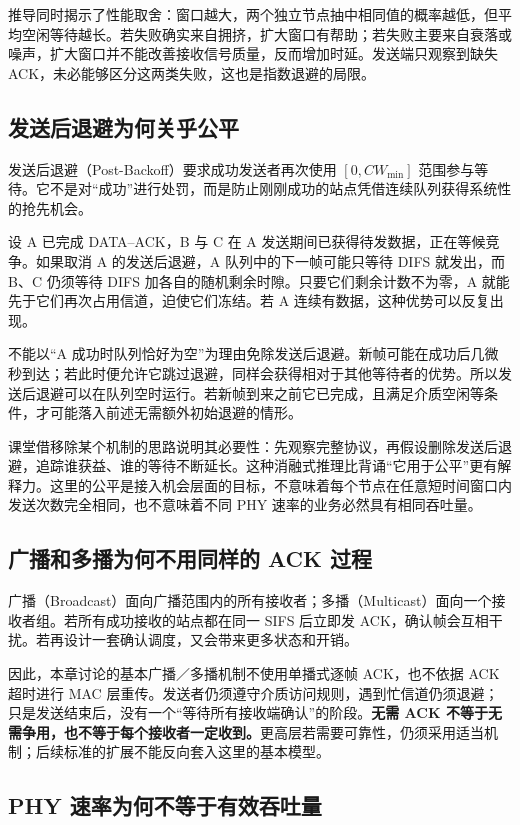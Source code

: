 推导同时揭示了性能取舍：窗口越大，两个独立节点抽中相同值的概率越低，但平均空闲等待越长。若失败确实来自拥挤，扩大窗口有帮助；若失败主要来自衰落或噪声，扩大窗口并不能改善接收信号质量，反而增加时延。发送端只观察到缺失 ACK，未必能够区分这两类失败，这也是指数退避的局限。

\subsection{发送后退避为何关乎公平}

发送后退避（Post-Backoff）要求成功发送者再次使用 $[0,CW_{\min}]$ 范围参与等待。它不是对“成功”进行处罚，而是防止刚刚成功的站点凭借连续队列获得系统性的抢先机会。

设 A 已完成 DATA--ACK，B 与 C 在 A 发送期间已获得待发数据，正在等候竞争。如果取消 A 的发送后退避，A 队列中的下一帧可能只等待 DIFS 就发出，而 B、C 仍须等待 DIFS 加各自的随机剩余时隙。只要它们剩余计数不为零，A 就能先于它们再次占用信道，迫使它们冻结。若 A 连续有数据，这种优势可以反复出现。

不能以“A 成功时队列恰好为空”为理由免除发送后退避。新帧可能在成功后几微秒到达；若此时便允许它跳过退避，同样会获得相对于其他等待者的优势。所以发送后退避可以在队列空时运行。若新帧到来之前它已完成，且满足介质空闲等条件，才可能落入前述无需额外初始退避的情形。

课堂借移除某个机制的思路说明其必要性：先观察完整协议，再假设删除发送后退避，追踪谁获益、谁的等待不断延长。这种消融式推理比背诵“它用于公平”更有解释力。这里的公平是接入机会层面的目标，不意味着每个节点在任意短时间窗口内发送次数完全相同，也不意味着不同 PHY 速率的业务必然具有相同吞吐量。

\subsection{广播和多播为何不用同样的 ACK 过程}

广播（Broadcast）面向广播范围内的所有接收者；多播（Multicast）面向一个接收者组。若所有成功接收的站点都在同一 SIFS 后立即发 ACK，确认帧会互相干扰。若再设计一套确认调度，又会带来更多状态和开销。

因此，本章讨论的基本广播／多播机制不使用单播式逐帧 ACK，也不依据 ACK 超时进行 MAC 层重传。发送者仍须遵守介质访问规则，遇到忙信道仍须退避；只是发送结束后，没有一个“等待所有接收端确认”的阶段。\textbf{无需 ACK 不等于无需争用，也不等于每个接收者一定收到。}更高层若需要可靠性，仍须采用适当机制；后续标准的扩展不能反向套入这里的基本模型。

\subsection{PHY 速率为何不等于有效吞吐量}

